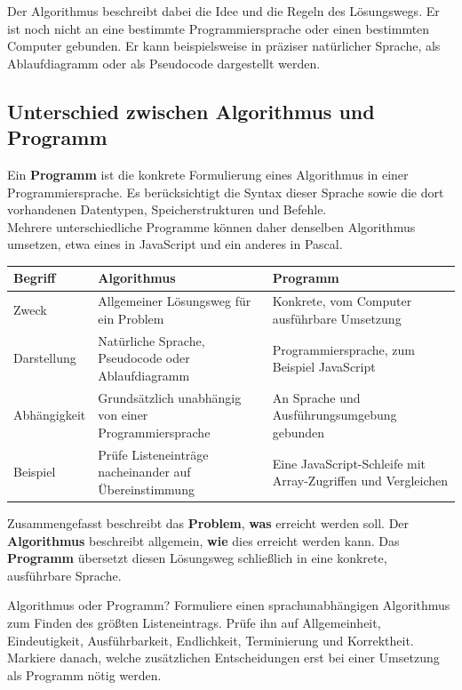 \documentclass{article}
\begin{document}
Der Algorithmus beschreibt dabei die Idee und die Regeln des Lösungswegs. Er ist noch nicht an eine bestimmte Programmiersprache oder einen bestimmten Computer gebunden. Er kann beispielsweise in präziser natürlicher Sprache, als Ablaufdiagramm oder als Pseudocode dargestellt werden.

\subsection{Unterschied zwischen Algorithmus und Programm}

Ein \textbf{Programm} ist die konkrete Formulierung eines Algorithmus in einer Programmiersprache. Es berücksichtigt die Syntax dieser Sprache sowie die dort vorhandenen Datentypen, Speicherstrukturen und Befehle.\\
Mehrere unterschiedliche Programme können daher denselben Algorithmus umsetzen, etwa eines in JavaScript und ein anderes in Pascal.

\begin{center}
\begin{tabular}{|p{4cm}|p{8cm}|p{8cm}|}
\hline
\textbf{Begriff} & \textbf{Algorithmus} & \textbf{Programm} \\
\hline
Zweck & Allgemeiner Lösungsweg für ein Problem & Konkrete, vom Computer ausführbare Umsetzung \\
\hline
Darstellung & Natürliche Sprache, Pseudocode oder Ablaufdiagramm & Programmiersprache, zum Beispiel JavaScript \\
\hline
Abhängigkeit & Grundsätzlich unabhängig von einer Programmiersprache & An Sprache und Ausführungsumgebung gebunden \\
\hline
Beispiel & Prüfe Listeneinträge nacheinander auf Übereinstimmung & Eine JavaScript-Schleife mit Array-Zugriffen und Vergleichen \\
\hline
\end{tabular}
\end{center}

Zusammengefasst beschreibt das \textbf{Problem}, \textbf{was} erreicht werden soll. Der \textbf{Algorithmus} beschreibt allgemein, \textbf{wie} dies erreicht werden kann. Das \textbf{Programm} übersetzt diesen Lösungsweg schließlich in eine konkrete, ausführbare Sprache.

\begin{uebung}{Algorithmus oder Programm?}
Formuliere einen sprachunabhängigen Algorithmus zum Finden des größten Listeneintrags. Prüfe ihn auf Allgemeinheit, Eindeutigkeit, Ausführbarkeit, Endlichkeit, Terminierung und Korrektheit. Markiere danach, welche zusätzlichen Entscheidungen erst bei einer Umsetzung als Programm nötig werden.
\end{uebung}
\end{document}
